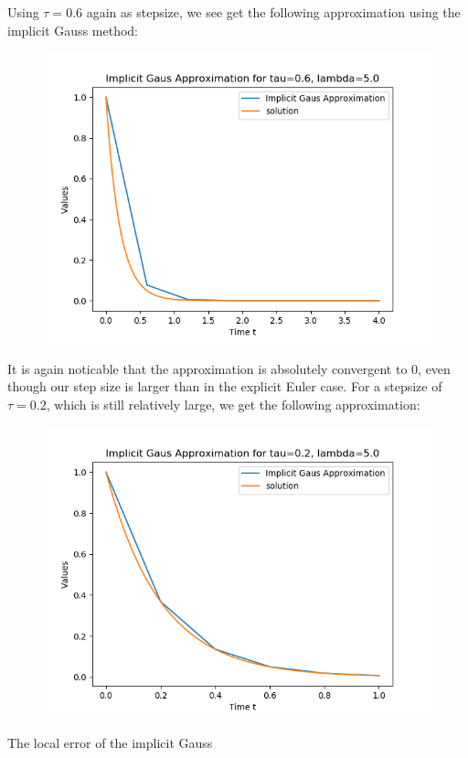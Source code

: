 \documentclass{article}
\begin{document}
\begin{itemize}
		Using $\tau = 0.6$ again as stepsize, we see get the
		following approximation using
		the implicit Gauss method:
		\begin{figure}[H]
			\includegraphics[scale=0.6]{implicit_gauss_06}
		\end{figure}
		It is again
		noticable that the approximation is absolutely convergent to
		$0$, even though our step size is larger than in the explicit
		Euler case. For a stepsize of $\tau=0.2$, which is still
		relatively large, we get the following approximation:
		\begin{figure}[H]
			\includegraphics[scale=0.6]{implicit_gauss_02}
		\end{figure}
		The local error of the implicit Gauss

\end{itemize}
\end{document}
